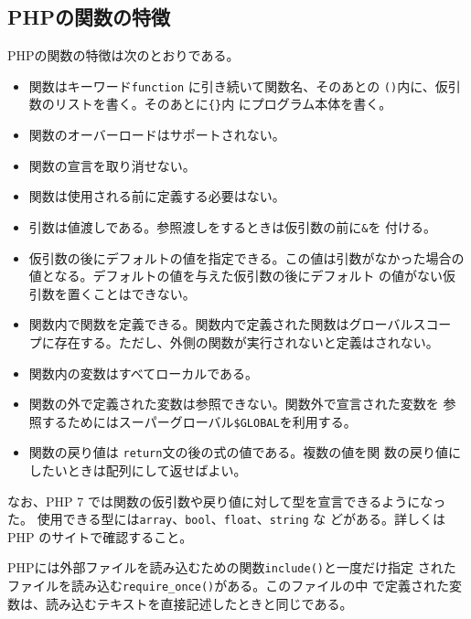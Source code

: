 \subsection{PHPの関数の特徴}
PHPの関数の特徴は次のとおりである。
\begin{itemize}
 \item 関数はキーワード\texttt{function} に引き続いて関数名、そのあとの
       \texttt{()}内に、仮引数のリストを書く。そのあとに\texttt{\{\}}内
       にプログラム本体を書く。
 \item 関数のオーバーロードはサポートされない。
 \item 関数の宣言を取り消せない。
 \item 関数は使用される前に定義する必要はない。
 \item 引数は値渡しである。参照渡しをするときは仮引数の前に\texttt{\&}を
       付ける。
 \item 仮引数の後にデフォルトの値を指定できる。この値は引数がなかった場合の
       値となる。デフォルトの値を与えた仮引数の後にデフォルト
       の値がない仮引数を置くことはできない。
 \item 関数内で関数を定義できる。関数内で定義された関数はグローバルスコー
       プに存在する。ただし、外側の関数が実行されないと定義はされない。
 \item 関数内の変数はすべてローカルである。
 \item 関数の外で定義された変数は参照できない。関数外で宣言された変数を
       参照するためにはスーパーグローバル\Verb+$GLOBAL+を利用する。
 \item 関数の戻り値は \texttt{return}文の後の式の値である。複数の値を関
       数の戻り値にしたいときは配列にして返せばよい。
\end{itemize}
なお、PHP 7 では関数の仮引数や戻り値に対して型を宣言できるようになった。
使用できる型には\Verb+array+、\Verb+bool+、\Verb+float+、\Verb+string+ な
どがある。詳しくは PHP のサイトで確認すること。


PHPには外部ファイルを読み込むための関数\texttt{include()}と一度だけ指定
されたファイルを読み込む\texttt{require\_once()}がある。このファイルの中
で定義された変数は、読み込むテキストを直接記述したときと同じである。
